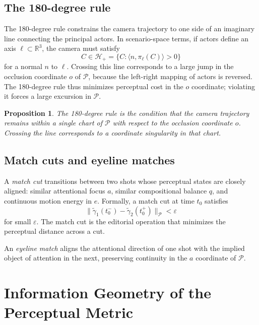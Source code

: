 \documentclass[12pt,a4paper]{article}
\theoremstyle{plain}
\newtheorem{proposition}[theorem]{Proposition}
\theoremstyle{definition}
\begin{document}
\subsection{The 180-degree rule}

The 180-degree rule constrains the camera trajectory to one side of an
imaginary line connecting the principal actors. In scenario-space terms, if
actors define an axis $\ell \subset \mathbb{R}^3$, the camera must satisfy
\[
C \in \mathcal{H}_+ = \{C : \langle n, \pi_\ell(C) \rangle > 0\}
\]
for a normal $n$ to $\ell$. Crossing this line corresponds to a large jump in
the occlusion coordinate $o$ of $\mathcal{P}$, because the left-right mapping
of actors is reversed. The 180-degree rule thus minimizes perceptual cost in
the $o$ coordinate; violating it forces a large excursion in $\mathcal{P}$.

\begin{proposition}
The 180-degree rule is the condition that the camera trajectory remains within a
single chart of $\mathcal{P}$ with respect to the occlusion coordinate $o$.
Crossing the line corresponds to a coordinate singularity in that chart.
\end{proposition}

\subsection{Match cuts and eyeline matches}

A \emph{match cut} transitions between two shots whose perceptual states are
closely aligned: similar attentional focus $a$, similar compositional balance
$q$, and continuous motion energy in $e$. Formally, a match cut at time $t_0$
satisfies
\[
\|\tilde\gamma_1(t_0^-) - \tilde\gamma_2(t_0^+)\|_\mathcal{P} < \varepsilon
\]
for small $\varepsilon$. The match cut is the editorial operation that minimizes
the perceptual distance across a cut.

An \emph{eyeline match} aligns the attentional direction of one shot with the
implied object of attention in the next, preserving continuity in the $a$
coordinate of $\mathcal{P}$.

\section{Information Geometry of the Perceptual Metric}
\label{sec:information}
\end{document}

